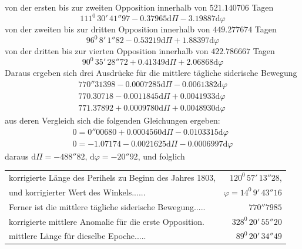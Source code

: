 von der ersten bis zur zweiten Opposition innerhalb von $521.140706$ Tagen
\[
111^0\,30'\,41''97-0.37965\mathrm d\Pi-3.19887\mathrm d\varphi
\]
von der zweiten bis zur dritten Opposition innerhalb von $449.277674$ Tagen
\[
96^0\,8'\,1''82-0.53219\mathrm d\Pi+1.88397\mathrm d\varphi
\]
von der dritten bis zur vierten Opposition innerhalb von $422.786667$ Tagen
\[
90^0\,35'\,28''72+0.41349\mathrm d\Pi+2.06868\mathrm d\varphi
\]
Daraus ergeben sich drei Ausdrücke für die mittlere tägliche siderische Bewegung
\[
\begin{gathered}
770''31398-0.0007285\mathrm d\Pi-0.0061382\mathrm d\varphi\\
770.30718-0.0011845\mathrm d\Pi+0.0041933\mathrm d\varphi\\
771.37892+0.0009780\mathrm d\Pi+0.0048930\mathrm d\varphi
\end{gathered}
\]
aus deren Vergleich sich die folgenden Gleichungen ergeben:
\[
\begin{gathered}
0=0''00680+0.0004560\mathrm d\Pi-0.0103315\mathrm d\varphi\\
0=-1.07174-0.0021625\mathrm d\Pi-0.0006997\mathrm d\varphi
\end{gathered}
\]
daraus $\mathrm d\Pi=-488''82$, $\mathrm d\varphi=-20''92$, und folglich
\par\nobreak\smallskip
\noindent\hspace*{.06\linewidth}%
{\fontsize{9}{11}\selectfont\begin{tabular}[t]{@{}p{.69\linewidth}@{\enspace}r@{}}
korrigierte Länge des Perihels zu Beginn des Jahres 1803,&$120^0\,57'\,13''28$,\\
und korrigierter Wert des Winkels\hfill\mbox{.\hspace{.76em}.\hspace{.76em}.\hspace{.76em}.\hspace{.76em}.\hspace{.76em}.}&$\varphi=14^0\,9'\,43''16$\\
Ferner ist die mittlere tägliche siderische Bewegung\hfill\mbox{.\hspace{.76em}.\hspace{.76em}.\hspace{.76em}.\hspace{.76em}.}&$770''7985$\\
korrigierte mittlere Anomalie für die erste Opposition\hfill\mbox{.}&$328^0\,20'\,55''20$\\
mittlere Länge für dieselbe Epoche\hfill\mbox{.\hspace{.76em}.\hspace{.76em}.\hspace{.76em}.\hspace{.76em}.}&$89^0\,20'\,34''49$
\end{tabular}}\par\nobreak\smallskip
